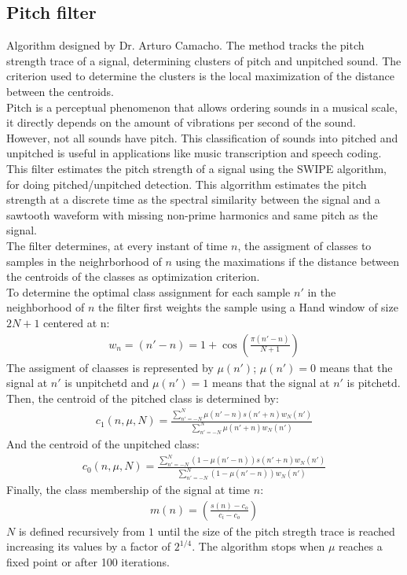 \documentclass[letterpaper]{article}
\begin{document}
\subsection{Pitch filter}
Algorithm designed by Dr. Arturo Camacho. The method tracks the pitch strength trace of a signal, determining clusters of pitch and unpitched sound. The criterion used to determine the clusters is the local maximization of the distance between the centroids. \\
Pitch is a perceptual phenomenon that allows ordering sounds in a musical scale, it directly depends on the amount of vibrations per second of the sound. However, not all sounds have pitch. This classification of sounds into pitched and unpitched is useful in applications like music transcription and speech coding.\\
This filter estimates the pitch strength of a signal using the SWIPE algorithm, for doing pitched/unpitched detection. This algorrithm estimates the pitch strength at a discrete time as the spectral similarity between the signal and a sawtooth waveform with missing non-prime harmonics and same pitch as the signal.\\
The filter determines, at every instant of time $n$, the assigment of classes to samples in the neighrborhood of $n$ using the maximations if the distance between the centroids of the classes as optimization criterion.\\
To determine the optimal class assignment for each sample $n'$ in the neighborhood of $n$ the filter first weights the sample using a Hand window of size $2N+1$ centered at n:
\begin{align}
w_n=(n'-n)=1+\cos\left(\frac{\pi(n'-n)}{N+1}\right)
\end{align}
The assigment of claasses is represented by $\mu(n')$; $\mu(n')=0$ means that the signal at $n'$ is unpitchetd and $\mu(n')=1$ means that the signal at $n'$ is pitchetd.\\
Then, the centroid of the pitched class is determined by:
\begin{align}
c_1(n,\mu,N)=\frac{\sum_{n'=-N}^N \mu(n'-n)s(n'+n)w_N(n')}{\sum_{n'=-N}^N \mu(n'+n)w_N(n')}
\end{align}
And the centroid of the unpitched class:
\begin{align}
c_0(n,\mu,N)=\frac{\sum_{n'=-N}^N (1-\mu(n'-n))s(n'+n)w_N(n')}{\sum_{n'=-N}^N (1-\mu(n'-n)) w_N(n')}
\end{align}
Finally, the class membership of the signal at time $n$:
\begin{align}
m(n)=\left(\frac{s(n)-c_o}{c_i-c_o}\right)
\end{align}
$N$ is defined recursively from $1$ until the size of the pitch stregth trace is reached increasing  its values by  a factor of $2^{1/4}$. The algorithm stops when $\mu$ reaches a fixed point or  after 100 iterations.
\end{document}
